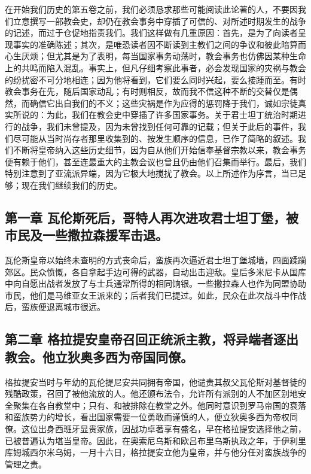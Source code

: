 在开始我们历史的第五卷之前，我们必须恳求那些可能阅读此论著的人，不要因我们立意撰写一部教会史，却仍在教会事务中穿插了可信的、对所述时期发生的战争的记述，而过于仓促地指责我们。我们这样做有几重原因：首先，是为了向读者呈现事实的准确陈述；其次，是唯恐读者因不断读到主教们之间的争议和彼此暗算而心生厌烦；但尤其是为了表明，每当国家事务动荡时，教会事务也仿佛因某种生命上的共鸣而陷入混乱。事实上，但凡仔细考察此事者，必会发现国家的灾祸与教会的纷扰密不可分地相连；因为他将看到，它们要么同时兴起，要么接踵而至。有时教会事务在先，随后国家动乱；有时则相反，故而我不信这种不断的交替仅是偶然，而确信它出自我们的不义；这些灾祸是作为应得的惩罚降于我们，诚如宗徒真实所说的：为此，我们在教会史中穿插了许多国家事务。关于君士坦丁统治时期进行的战争，我们未曾提及，因为未曾找到任何可靠的记载；但关于此后的事件，我们尽可能从当时尚存者那里收集到的、按发生顺序的信息，已作了简略的叙述。我们不断将皇帝纳入这些历史细节，因为自从他们开始信奉基督宗教以来，教会事务便有赖于他们，甚至连最重大的主教会议也曾且仍由他们召集而举行。最后，我们特别注意到了亚流派异端，因为它极大地搅扰了教会。以上所述作为序言，当已足够；现在我们继续我们的历史。\par


\subsection{第一章 瓦伦斯死后，哥特人再次进攻君士坦丁堡，被市民及一些撒拉森援军击退。}

瓦伦斯皇帝以始终未查明的方式丧命后，蛮族再次逼近君士坦丁堡城墙，四面蹂躏郊区。民众愤慨，各自拿起手边可得的武器，自动出击迎敌。皇后多米尼卡从国库中向自愿出战者发放了与士兵通常所得的相同饷银。一些撒拉森人也作为同盟协助市民，他们是马维亚女王派来的；后者我们已提过。如此，民众在此次战斗中作战后，蛮族便退离城市很远。\par


\subsection{第二章 格拉提安皇帝召回正统派主教，将异端者逐出教会。他立狄奥多西为帝国同僚。}

格拉提安当时与年幼的瓦伦提尼安共同拥有帝国，他谴责其叔父瓦伦斯对基督徒的残酷政策，召回了被他流放的人。他还颁布法令，允许所有派别的人不加区别地安全聚集在各自教堂中；只有、和被排除在教堂之外。他同时意识到罗马帝国的衰落和蛮族势力的增长，看出国家需要一位勇敢而谨慎的人，便立狄奥多西为帝权同僚。这位出身西班牙显贵家族，因战功卓著享有盛名，早在格拉提安选择他之前，已被普遍认为堪当皇帝。因此，在奥索尼乌斯和欧吕布里乌斯执政之年，于伊利里库姆城西尔米乌姆，一月十六日，格拉提安立他为皇帝，并与他分任对蛮族战争的管理之责。\par


